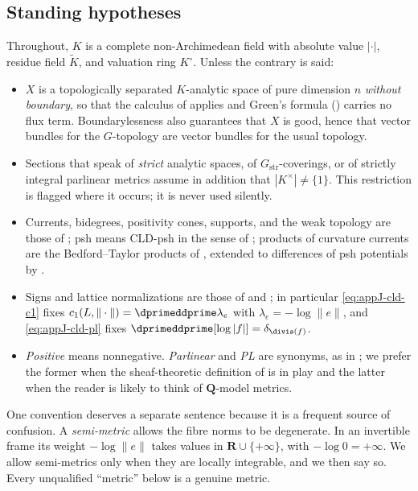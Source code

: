 \subsection{Standing hypotheses}
\label{sec:ch17-hypotheses}

Throughout, $K$ is a complete non-Archimedean field with absolute value
$|\cdot|$, residue field $\widetilde K$, and valuation ring
$K^\circ$.  Unless the contrary is said:

\begin{itemize}
\item $X$ is a topologically separated $K$-analytic space of pure
 dimension $n$ \emph{without boundary}, so that the calculus of
  applies and Green's formula
 () carries no flux term.  Boundarylessness
 also guarantees that $X$ is good, hence that vector bundles for the
 $G$-topology are vector bundles for the usual topology.
\item Sections that speak of \emph{strict} analytic spaces, of
 $G_{\mathrm{str}}$-coverings, or of strictly integral parlinear metrics
 assume in addition that $|K^\times|\ne\{1\}$.  This restriction is
 flagged where it occurs; it is never used silently.
\item Currents, bidegrees, positivity cones, supports, and the weak topology
 are those of ; psh means CLD-psh in the sense of
 ; products of curvature currents are the
 Bedford--Taylor products of , extended to
 differences of psh potentials by .
\item Signs and lattice normalizations are those of
  and ; in
 particular \eqref{eq:appJ-cld-c1} fixes
 $c_1(L,\|\cdot\|)=\dprimeddprime\lambda_e$ with
 $\lambda_e=-\log\|e\|$, and \eqref{eq:appJ-cld-pl} fixes
 $\dprimeddprime[\log|f|]=\delta_{\divis(f)}$.
\item \emph{Positive} means nonnegative.  \emph{Parlinear} and \emph{PL} are
 synonyms, as in ; we prefer the former when
 the sheaf-theoretic definition of  is in play
 and the latter when the reader is likely to think of $\mathbf Q$-model
 metrics.
\end{itemize}

One convention deserves a separate sentence because it is a frequent source
of confusion.  A \emph{semi-metric} allows the fibre norms to be
degenerate.  In an invertible frame its weight $-\log\|e\|$ takes values
in $\mathbf R\cup\{+\infty\}$, with $-\log0=+\infty$.  We
allow semi-metrics only when they are locally integrable, and we then say so.
Every unqualified ``metric'' below is a genuine metric.

